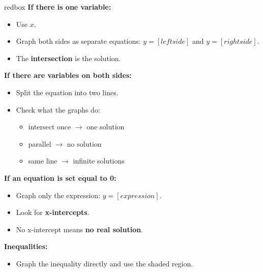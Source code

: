 \documentclass[14pt]{article}
\begin{document}
    \begin{skillbox}{redbox}
        \textbf{If there is one variable:}
        \begin{itemize}
            \item Use \textbf{$x$}.
            \item Graph both sides as separate equations: $y=[left side]$ and $y=[right side]$.
            \item The \textbf{intersection} is the solution.
        \end{itemize}

        \textbf{If there are variables on both sides:}
        \begin{itemize}
            \item Split the equation into two lines.
            \item Check what the graphs do:
            \begin{itemize}
                \item intersect once $\rightarrow$ one solution
                \item parallel $\rightarrow$ no solution
                \item same line $\rightarrow$ infinite solutions
            \end{itemize}
        \end{itemize}

        \textbf{If an equation is set equal to 0:}
        \begin{itemize}
            \item Graph only the expression: $y=[expression]$.
            \item Look for \textbf{x-intercepts}.
            \item No x-intercept means \textbf{no real solution}.
        \end{itemize}

        \textbf{Inequalities:}
        \begin{itemize}
            \item Graph the inequality directly and use the shaded region.
        \end{itemize}
    \end{skillbox}
\end{document}
